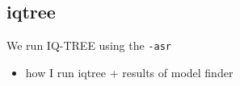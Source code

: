 \subsection{iqtree}


We run IQ-TREE using the \texttt{-asr}

\begin{itemize}
	\item how I run iqtree + results of model finder
\end{itemize}

